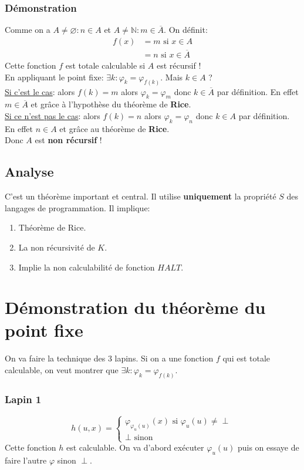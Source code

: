 \documentclass{report}
\begin{document}
\subsubsection{Démonstration}
Comme on a $A \neq \varnothing : n \in A$ et $A \neq \mathbb{N}: m \in \overline{A}$. On définit:
\begin{align*}
f(x) &= m \text{ si } x \in A\\
&= n \text{ si } x \in \overline{A}
\end{align*}
Cette fonction $f$ est totale calculable si $A$ est récursif !\\
En appliquant le point fixe: $\exists k : \varphi_k = \varphi_{f(k)}$. Mais $k \in A$ ?\\
\underline{Si c'est le cas}: alors $f(k) = m$ alors $\varphi_k = \varphi_m$ donc $k \in \overline{A}$ par définition. En effet $m \in \overline{A}$ et grâce à l'hypothèse du théorème de \textbf{Rice}. \\
\underline{Si ce n'est pas le cas}: alors $f(k) = n$ alors $\varphi_k = \varphi_n$ donc $k \in A$ par définition. En effet $n \in A$ et grâce au théorème de \textbf{Rice}.\\
Donc $A$ est \textbf{non récursif} !

\subsection{Analyse}
C'est un théorème important et central. Il utilise \textbf{uniquement} la propriété $S$ des langages de programmation. Il implique:
\begin{enumerate}
\item Théorème de Rice.
\item La non récursivité de $K$.
\item Implie la non calculabilité de fonction $HALT$.
\end{enumerate}

\section{Démonstration du théorème du point fixe}
On va faire la technique des $3$ lapins. Si on a une fonction $f$ qui est totale calculable, on veut montrer que $\exists k: \varphi_k = \varphi_{f(k)}$.
\subsubsection{Lapin 1}
\begin{equation}
h(u,x) = \begin{cases}
\varphi_{\varphi_u (u)}(x) \text{ si } \varphi_u (u) \neq \perp \\
\perp \text{ sinon}
\end{cases}
\label{Lapin1}
\end{equation}
Cette fonction $h$ est calculable. On va d'abord exécuter $\varphi_u (u)$ puis on essaye de faire l'autre $\varphi$ sinon $\perp$.
\end{document}
